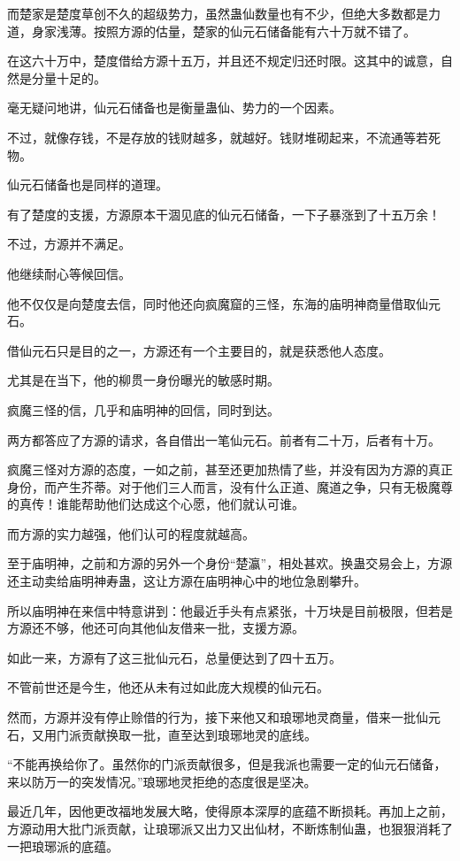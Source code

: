 \begin{this_body}
而楚家是楚度草创不久的超级势力，虽然蛊仙数量也有不少，但绝大多数都是力道，身家浅薄。按照方源的估量，楚家的仙元石储备能有六十万就不错了。

在这六十万中，楚度借给方源十五万，并且还不规定归还时限。这其中的诚意，自然是分量十足的。

毫无疑问地讲，仙元石储备也是衡量蛊仙、势力的一个因素。

不过，就像存钱，不是存放的钱财越多，就越好。钱财堆砌起来，不流通等若死物。

仙元石储备也是同样的道理。

有了楚度的支援，方源原本干涸见底的仙元石储备，一下子暴涨到了十五万余！

不过，方源并不满足。

他继续耐心等候回信。

他不仅仅是向楚度去信，同时他还向疯魔窟的三怪，东海的庙明神商量借取仙元石。

借仙元石只是目的之一，方源还有一个主要目的，就是获悉他人态度。

尤其是在当下，他的柳贯一身份曝光的敏感时期。

疯魔三怪的信，几乎和庙明神的回信，同时到达。

两方都答应了方源的请求，各自借出一笔仙元石。前者有二十万，后者有十万。

疯魔三怪对方源的态度，一如之前，甚至还更加热情了些，并没有因为方源的真正身份，而产生芥蒂。对于他们三人而言，没有什么正道、魔道之争，只有无极魔尊的真传！谁能帮助他们达成这个心愿，他们就认可谁。

而方源的实力越强，他们认可的程度就越高。

至于庙明神，之前和方源的另外一个身份“楚瀛”，相处甚欢。换蛊交易会上，方源还主动卖给庙明神寿蛊，这让方源在庙明神心中的地位急剧攀升。

所以庙明神在来信中特意讲到：他最近手头有点紧张，十万块是目前极限，但若是方源还不够，他还可向其他仙友借来一批，支援方源。

如此一来，方源有了这三批仙元石，总量便达到了四十五万。

不管前世还是今生，他还从未有过如此庞大规模的仙元石。

然而，方源并没有停止赊借的行为，接下来他又和琅琊地灵商量，借来一批仙元石，又用门派贡献换取一批，直至达到琅琊地灵的底线。

“不能再换给你了。虽然你的门派贡献很多，但是我派也需要一定的仙元石储备，来以防万一的突发情况。”琅琊地灵拒绝的态度很是坚决。

最近几年，因他更改福地发展大略，使得原本深厚的底蕴不断损耗。再加上之前，方源动用大批门派贡献，让琅琊派又出力又出仙材，不断炼制仙蛊，也狠狠消耗了一把琅琊派的底蕴。


\end{this_body}
